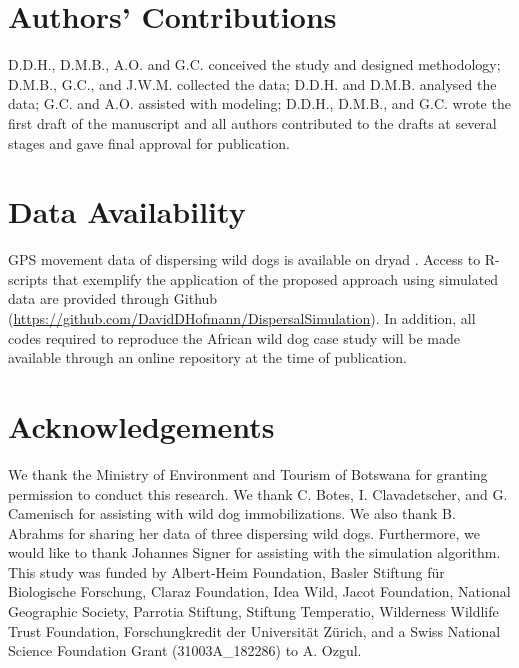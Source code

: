 \documentclass[abstract=on,10pt,a4paper,bibliography=totocnumbered]{article}
\begin{document}
\section{Authors' Contributions}
D.D.H., D.M.B., A.O. and G.C. conceived the study and designed methodology;
D.M.B., G.C., and J.W.M. collected the data; D.D.H. and D.M.B. analysed the
data; G.C. and A.O. assisted with modeling; D.D.H., D.M.B., and G.C. wrote the
first draft of the manuscript and all authors contributed to the drafts at
several stages and gave final approval for publication.

\section{Data Availability}
GPS movement data of dispersing wild dogs is available on dryad
\citep{Hofmann.2021b}. Access to R-scripts that exemplify the application of the
proposed approach using simulated data are provided through Github
(\url{https://github.com/DavidDHofmann/DispersalSimulation}). In addition, all
codes required to reproduce the African wild dog case study will be made
available through an online repository at the time of publication.

\section{Acknowledgements}
We thank the Ministry of Environment and Tourism of Botswana for granting
permission to conduct this research. We thank C. Botes, I. Clavadetscher, and G.
Camenisch for assisting with wild dog immobilizations. We also thank B. Abrahms
for sharing her data of three dispersing wild dogs. Furthermore, we would like
to thank Johannes Signer for assisting with the simulation algorithm. This study
was funded by Albert-Heim Foundation, Basler Stiftung für Biologische Forschung,
Claraz Foundation, Idea Wild, Jacot Foundation, National Geographic Society,
Parrotia Stiftung, Stiftung Temperatio, Wilderness Wildlife Trust Foundation,
Forschungkredit der Universität Zürich, and a Swiss National Science Foundation
Grant (31003A\_182286) to A. Ozgul.

\newpage
\begingroup
\singlespacing

\endgroup
\end{document}
